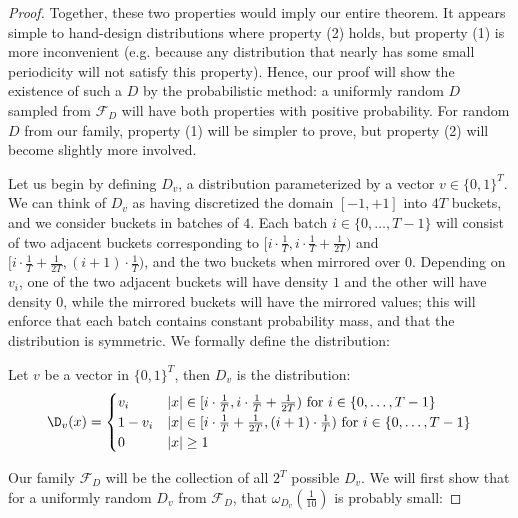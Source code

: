 \begin{proof}
Together, these two properties would imply our entire theorem. It appears simple to hand-design distributions where property (2) holds, but property (1) is more inconvenient (e.g. because any distribution that nearly has some small periodicity will not satisfy this property). Hence, our proof will show the existence of such a $D$ by the probabilistic method: a uniformly random $D$ sampled from $\mathcal{F}_D$ will have both properties with positive probability. For random $D$ from our family, property (1) will be simpler to prove, but property (2) will become slightly more involved.

Let us begin by defining $D_v$, a distribution parameterized by a vector $v \in \{0,1\}^T$. We can think of $D_v$ as having discretized the domain $[-1,+1]$ into $4T$ buckets, and we consider buckets in batches of $4$. Each batch $i \in \{0,\dots,T-1\}$ will consist of two adjacent buckets corresponding to $[i \cdot \frac{1}{T},i \cdot \frac{1}{T} + \frac{1}{2T})$ and $[i \cdot \frac{1}{T} + \frac{1}{2T},(i+1) \cdot \frac{1}{T})$, and the two buckets when mirrored over $0$. Depending on $v_i$, one of the two adjacent buckets will have density $1$ and the other will have density $0$, while the mirrored buckets will have the mirrored values; this will enforce that each batch contains constant probability mass, and that the distribution is symmetric. We formally define the distribution:

\begin{definition}
    Let $v$ be a vector in $\{0,1\}^T$, then $D_v$ is the distribution:
     \begin{align*}
     \D_v(x) = \begin{cases} 
          v_i & |x| \in [i \cdot \frac{1}{T},i \cdot \frac{1}{T} + \frac{1}{2T}) \textrm{ for } i \in \{0,\dots,T-1\}\\
          1-v_i & |x| \in [i \cdot \frac{1}{T} + \frac{1}{2T},(i+1) \cdot \frac{1}{T}) \textrm{ for } i \in \{0,\dots,T-1\}\\
          0 & |x| \ge 1
       \end{cases}
    \end{align*}
\end{definition}

Our family $\mathcal{F}_D$ will be the collection of all $2^T$ possible $D_v$. We will first show that for a uniformly random $D_v$ from $\mathcal{F}_D$, that $\omega_{D_v}(\frac{1}{10})$ is probably small:


\end{proof}
